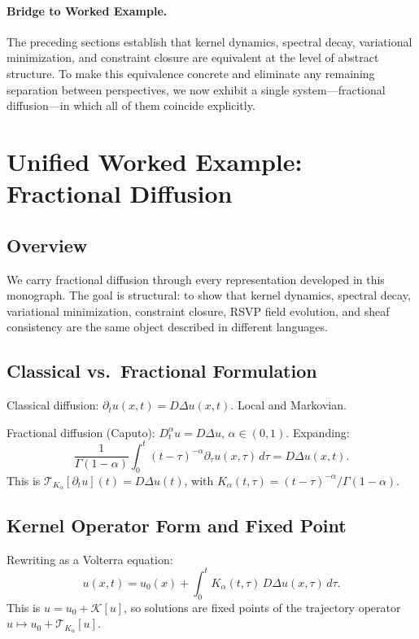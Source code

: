 \documentclass[12pt]{article}
\begin{document}
\paragraph{Bridge to Worked Example.}
The preceding sections establish that kernel dynamics, spectral decay,
variational minimization, and constraint closure are equivalent at the
level of abstract structure. To make this equivalence concrete and
eliminate any remaining separation between perspectives, we now exhibit
a single system---fractional diffusion---in which all of them coincide
explicitly.

\section{Unified Worked Example: Fractional Diffusion}
\label{sec:worked}

\subsection{Overview}

We carry fractional diffusion through every representation developed in
this monograph. The goal is structural: to show that kernel dynamics,
spectral decay, variational minimization, constraint closure, RSVP field
evolution, and sheaf consistency are the same object described in different
languages.

\subsection{Classical vs.\ Fractional Formulation}

Classical diffusion: $\partial_t u(x,t) = D\Delta u(x,t)$.
Local and Markovian.

Fractional diffusion (Caputo): $D_t^\alpha u = D\Delta u$, $\alpha \in (0,1)$.
Expanding:
\[
  \frac{1}{\Gamma(1-\alpha)}\int_0^t (t-\tau)^{-\alpha}\partial_\tau u(x,\tau)\,d\tau
  = D\Delta u(x,t).
\]
This is $\mathcal{T}_{K_\alpha}[\partial_t u](t) = D\Delta u(t)$, with
$K_\alpha(t,\tau) = (t-\tau)^{-\alpha}/\Gamma(1-\alpha)$.

\subsection{Kernel Operator Form and Fixed Point}

Rewriting as a Volterra equation:
\[
  u(x,t) = u_0(x) + \int_0^t K_\alpha(t,\tau)\,D\Delta u(x,\tau)\,d\tau.
\]
This is $u = u_0 + \mathcal{K}[u]$, so solutions are fixed points of the
trajectory operator $u \mapsto u_0 + \mathcal{T}_{K_\alpha}[u]$.
\end{document}
